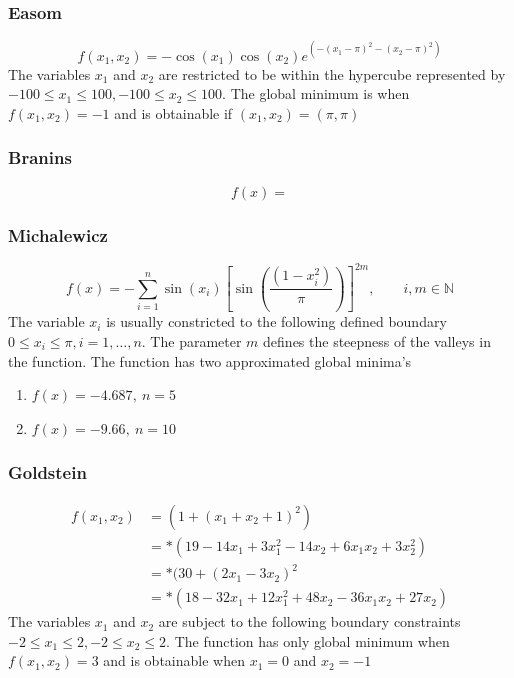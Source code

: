 \subsubsection{Easom}
\begin{equation}
	f(x_1,x_2) = -\cos(x_1)\cos(x_2)e^{(-(x_1 - \pi)^2 - (x_2 - \pi)^2)}
\end{equation}
The variables $x_1$ and $x_2$ are restricted to be within the hypercube represented by $-100 \leq x_1 \leq 100, -100 \leq x_2 \leq 100$. The global minimum is when $f(x_1,x_2) = -1$ and is obtainable if $(x_1,x_2) = (\pi,\pi)$
\subsubsection{Branins}
\begin{equation}
	f(x) =
\end{equation}
\subsubsection{Michalewicz}
\begin{equation}
	f(x) = -\sum_{i=1}^n\sin{(x_i)}[\sin{(\frac{(1 - x_i^2)}{\pi})}]^{2m}, \qquad i,m \in \mathbb{N}
\end{equation}
The variable $x_i$ is usually constricted to the following defined boundary $0 \leq x_i \leq \pi, i = 1,\ldots,n$. The parameter $m$ defines the steepness of the valleys in the function. The function has two approximated global minima's
\begin{enumerate}
\item $f(x) = -4.687,\: n = 5$
\item $f(x) = -9.66,\: n = 10$
\end{enumerate}
\subsubsection{Goldstein}
\begin{align}
	f(x_1,x_2) &= (1 + (x_1 + x_2 + 1)^2)\nonumber\\
			   &=*(19-14x_1+3x_1^2 -14x_2 + 6x_1x_2 + 3x_2^2)\nonumber\\
			   &=*(30 + (2x_1 -3x_2)^2\nonumber\\
			   &=*(18 - 32x_1 + 12x_1^2 +48x_2 -36x_1x_2 + 27x_2)\nonumber
\end{align}
The variables $x_1$ and $x_2$ are subject to the following boundary constraints $-2 \leq x_1 \leq 2, -2 \leq x_2 \leq 2$. The function has only global minimum when $f(x_1,x_2) = 3$ and is obtainable when $x_1 = 0$ and $x_2 = -1$

